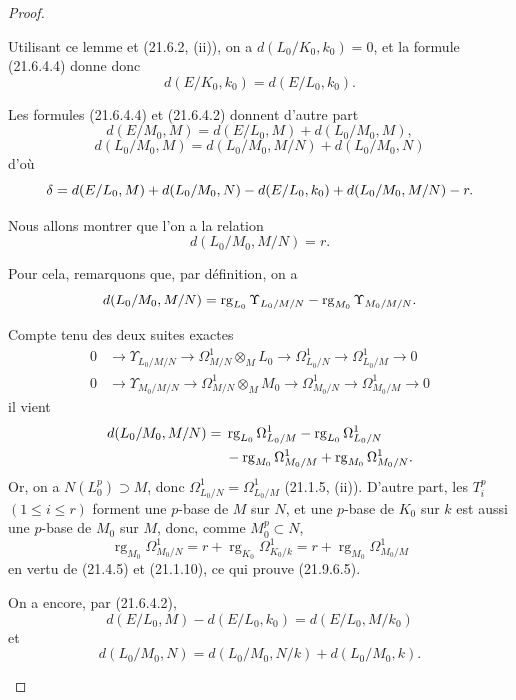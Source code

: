 \begin{proof}
\begin{enumerate}
  Utilisant ce lemme et (21.6.2, (ii)), on a $d(L_0/K_0,k_0)=0$, et la
  formule (21.6.4.4) donne donc
  \[
    d(E/K_0,k_0)=d(E/L_0,k_0).
  \]

  Les formules (21.6.4.4) et (21.6.4.2) donnent d'autre part
  \[
    d(E/M_0,M)=d(E/L_0,M)+d(L_0/M_0,M),
  \]
  \[
    d(L_0/M_0,M)=d(L_0/M_0,M/N)+d(L_0/M_0,N)
  \]
  d'où
  \[
    \delta=d(E/L_0,M)+d(L_0/M_0,N)- d(E/L_0,k_0)
    +d(L_0/M_0,M/N)- r.
  \]

  Nous allons montrer que l'on a la relation
  \begin{equation}
  \tag{21.9.6.5}
  \label{0.21.9.6.5-fr}
    d(L_0/M_0,M/N)=r.
  \end{equation}

  Pour cela, remarquons que, par définition, on a
  \[
    d(L_0/M_0,M/N)
    =\operatorname{rg}_{L_0}\Upsilon_{L_0/M/N}
    -\operatorname{rg}_{M_0}\Upsilon_{M_0/M/N}.
  \]

  Compte tenu des deux suites exactes
  \[
  \begin{aligned}
    0&\longrightarrow\Upsilon_{L_0/M/N}
      \longrightarrow\Omega^1_{M/N}\otimes_ML_0
      \longrightarrow\Omega^1_{L_0/N}
      \longrightarrow\Omega^1_{L_0/M}\longrightarrow0\\
    0&\longrightarrow\Upsilon_{M_0/M/N}
      \longrightarrow\Omega^1_{M/N}\otimes_MM_0
      \longrightarrow\Omega^1_{M_0/N}
      \longrightarrow\Omega^1_{M_0/M}\longrightarrow0
  \end{aligned}
  \]
  il vient
  \[
  \begin{split}
    d(L_0/M_0,M/N)={}&\operatorname{rg}_{L_0}\Omega^1_{L_0/M}
      -\operatorname{rg}_{L_0}\Omega^1_{L_0/N}\\
      &-\operatorname{rg}_{M_0}\Omega^1_{M_0/M}
      +\operatorname{rg}_{M_0}\Omega^1_{M_0/N}.
  \end{split}
  \]
  Or, on a $N(L_0^p)\supset M$, donc
  $\Omega^1_{L_0/N}=\Omega^1_{L_0/M}$ (21.1.5, (ii)). D'autre part, les
  $T_i^p$ $(1\leqslant i\leqslant r)$ forment une $p$-base de $M$ sur $N$,
  et une $p$-base de $K_0$ sur $k$ est aussi une $p$-base de $M_0$ sur $M$,
  donc, comme $M_0^p\subset N$,
  \[
    \operatorname{rg}_{M_0}\Omega^1_{M_0/N}
    =r+\operatorname{rg}_{K_0}\Omega^1_{K_0/k}
    =r+\operatorname{rg}_{M_0}\Omega^1_{M_0/M}
  \]
  en vertu de (21.4.5) et (21.1.10), ce qui prouve (21.9.6.5).

  On a encore, par (21.6.4.2),
  \[
    d(E/L_0,M)-d(E/L_0,k_0)=d(E/L_0,M/k_0)
  \]
  et
  \[
    d(L_0/M_0,N)=d(L_0/M_0,N/k)+d(L_0/M_0,k).
  \]


\end{enumerate}
\end{proof}
